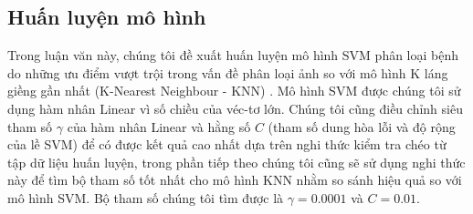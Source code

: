 \subsection{Huấn luyện mô hình} \label{sec:training-model}
Trong luận văn này, chúng tôi đề xuất huấn luyện mô hình SVM phân loại bệnh do những ưu điểm vượt trội trong vấn đề phân loại ảnh so với mô hình K láng giềng gần nhất (K-Nearest Neighbour - KNN) \cite{kim12012comparing}. Mô hình SVM được chúng tôi sử dụng hàm nhân Linear vì số chiều của véc-tơ lớn. Chúng tôi cũng điều chỉnh siêu tham số $\gamma$ của hàm nhân Linear và hằng số $C$ (tham số dung hòa lỗi và độ rộng của lề SVM) để có được kết quả cao nhất dựa trên nghi thức kiểm tra chéo từ tập dữ liệu huấn luyện, trong phần tiếp theo chúng tôi cũng sẽ sử dụng nghi thức này để tìm bộ tham số tốt nhất cho mô hình KNN nhằm so sánh hiệu quả so với mô hình SVM. Bộ tham số chúng tôi tìm được là $\gamma = 0.0001$ và $C = 0.01$. 

